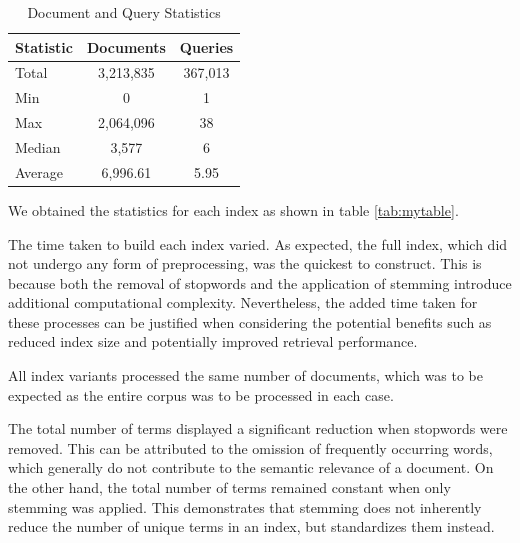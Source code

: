 \documentclass[11pt,a4paper]{article}
\begin{document}
\begin{table}[htbp]
    \centering
    \caption{Document and Query Statistics}
    \label{tab:statistics}
    \begin{tabular}{lcc}
        \toprule
        \multicolumn{1}{c}{\textbf{Statistic}} & \multicolumn{1}{c}{\textbf{Documents}} & \multicolumn{1}{c}{\textbf{Queries}} \\
        \midrule
        Total                                  & 3,213,835                              & 367,013                              \\
        Min                                    & 0                                      & 1                                    \\
        Max                                    & 2,064,096                              & 38                                   \\
        Median                                 & 3,577                                  & 6                                    \\
        Average                                & 6,996.61                               & 5.95                                 \\
        \bottomrule
    \end{tabular}
\end{table}

We obtained the statistics for each index as shown in table
\ref{tab:mytable}.

The time taken to build each index varied. As expected, the full
index, which did not undergo any form of preprocessing, was the
quickest to construct. This is because both the removal of stopwords
and the application of stemming introduce additional computational
complexity. Nevertheless, the added time taken for these processes
can be justified when considering the potential benefits such as
reduced index size and potentially improved retrieval performance.

All index variants processed the same number of documents, which was
to be expected as the entire corpus was to be processed in each case.

The total number of terms displayed a significant reduction when
stopwords were removed. This can be attributed to the omission of
frequently occurring words, which generally do not contribute to the
semantic relevance of a document. On the other hand, the total number
of terms remained constant when only stemming was applied. This
demonstrates that stemming does not inherently reduce the number of
unique terms in an index, but standardizes them instead.
\end{document}
